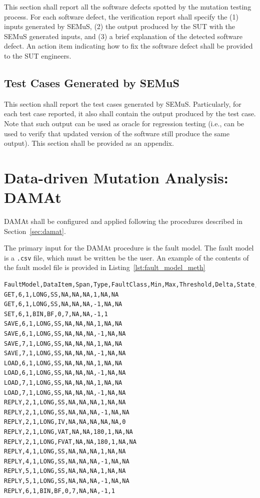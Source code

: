 This section shall report all the software defects spotted by the mutation testing process. For each software defect, the verification report shall specify the (1) inputs generated by SEMuS, (2) the output produced by the SUT with the SEMuS generated inputs, and (3) a brief explanation of the detected software defect.
An action item indicating how to fix the software defect shall be provided to the SUT engineers.

\subsection{Test Cases Generated by SEMuS}

This section shall report the test cases generated by SEMuS. Particularly, for each test case reported, it also shall contain the output produced by the test case. Note that such output can be used as oracle for regression testing (i.e., can be used to verify that updated version of the software still produce the same output).
This section shall be provided as an appendix.


 \ENDCHANGEDFINAL


\clearpage
\section{Data-driven Mutation Analysis: DAMAt}
\label{sec:meth:damat}

DAMAt shall be configured and applied following the procedures described in Section~\ref{sec:damat}.

\STARTCHANGEDFINAL

The primary input for the DAMAt procedure is the fault model.
The fault model is a \texttt{.csv} file, which must be written be the user.
An example of the contents of the fault model file is provided in Listing~\ref{lst:fault_model_meth}

\begin{lstlisting}[caption={Example of a DAMAt fault model, represented in a \texttt{.csv} file. },label={lst:fault_model_meth}]
FaultModel,DataItem,Span,Type,FaultClass,Min,Max,Threshold,Delta,State,Value
GET,6,1,LONG,SS,NA,NA,NA,1,NA,NA
GET,6,1,LONG,SS,NA,NA,NA,-1,NA,NA
SET,6,1,BIN,BF,0,7,NA,NA,-1,1
SAVE,6,1,LONG,SS,NA,NA,NA,1,NA,NA
SAVE,6,1,LONG,SS,NA,NA,NA,-1,NA,NA
SAVE,7,1,LONG,SS,NA,NA,NA,1,NA,NA
SAVE,7,1,LONG,SS,NA,NA,NA,-1,NA,NA
LOAD,6,1,LONG,SS,NA,NA,NA,1,NA,NA
LOAD,6,1,LONG,SS,NA,NA,NA,-1,NA,NA
LOAD,7,1,LONG,SS,NA,NA,NA,1,NA,NA
LOAD,7,1,LONG,SS,NA,NA,NA,-1,NA,NA
REPLY,2,1,LONG,SS,NA,NA,NA,1,NA,NA
REPLY,2,1,LONG,SS,NA,NA,NA,-1,NA,NA
REPLY,2,1,LONG,IV,NA,NA,NA,NA,NA,0
REPLY,2,1,LONG,VAT,NA,NA,180,1,NA,NA
REPLY,2,1,LONG,FVAT,NA,NA,180,1,NA,NA
REPLY,4,1,LONG,SS,NA,NA,NA,1,NA,NA
REPLY,4,1,LONG,SS,NA,NA,NA,-1,NA,NA
REPLY,5,1,LONG,SS,NA,NA,NA,1,NA,NA
REPLY,5,1,LONG,SS,NA,NA,NA,-1,NA,NA
REPLY,6,1,BIN,BF,0,7,NA,NA,-1,1
\end{lstlisting}

